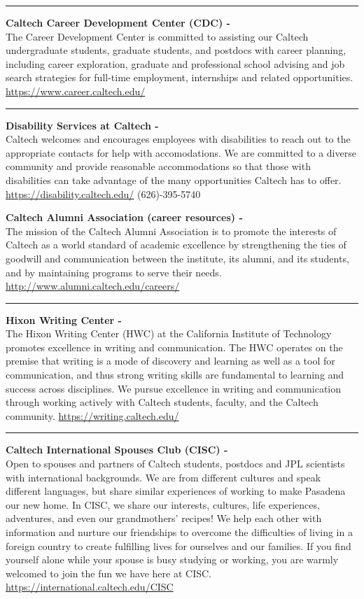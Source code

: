 \documentclass[12pt]{article}
\begin{document}
\rule{\textwidth}{0.5pt}

\textbf{Caltech Career Development Center (CDC) -}\\
The Career Development Center is committed to assisting our Caltech undergraduate students, graduate students, and postdocs with career planning, including career exploration, graduate and professional school advising and job search strategies for full-time employment, internships and related opportunities.
\url{https://www.career.caltech.edu/}

\rule{\textwidth}{0.5pt}

\textbf{Disability Services at Caltech -}\\
Caltech welcomes and encourages employees with disabilities to reach out to the appropriate contacts for help with accomodations.  We are committed to a diverse community and provide reasonable accommodations so that those with disabilities can take advantage of the many opportunities Caltech has to offer.
\url{https://disability.caltech.edu/} (626)-395-5740

\textbf{Caltech Alumni Association (career resources) -}\\
The mission of the Caltech Alumni Association is to promote the interests of Caltech as a world standard of academic excellence by strengthening the ties of goodwill and communication between the institute, its alumni, and its students, and by maintaining programs to serve their needs.
\url{http://www.alumni.caltech.edu/careers/}

\rule{\textwidth}{0.5pt}

\textbf{Hixon Writing Center -}\\ 
The Hixon Writing Center (HWC) at the California Institute of Technology promotes excellence in writing and communication. The HWC operates on the premise that writing is a mode of discovery and learning as well as a tool for communication, and thus strong writing skills are fundamental to learning and success across disciplines. We pursue excellence in writing and communication through working actively with Caltech students, faculty, and the Caltech community.
\url{https://writing.caltech.edu/}

\rule{\textwidth}{0.5pt}

\textbf{Caltech International Spouses Club (CISC) -}\\
Open to spouses and partners of Caltech students, postdocs and JPL scientists with international backgrounds.  We are from different cultures and speak different languages, but share similar experiences of working to make Pasadena our new home. In CISC, we share our interests, cultures, life experiences, adventures, and even our grandmothers' recipes!  We help each other with information and nurture our friendships to overcome the difficulties of living in a foreign country to create fulfilling lives for ourselves and our families. If you find yourself alone while your spouse is busy studying or working, you are warmly welcomed to join the fun we have here at CISC.
\url{https://international.caltech.edu/CISC}
\end{document}

